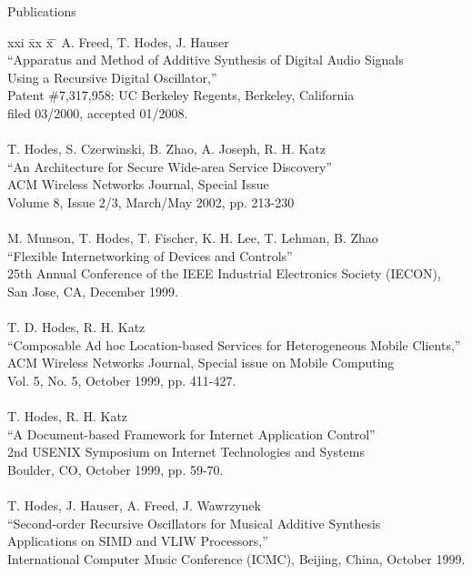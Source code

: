 \begin{bf} \large
Publications
\end{bf}
\begin{tabbing}
xxi \= xx \= x \= \kill
\>  A. Freed, T. Hodes, J. Hauser \\
\>\>	``Apparatus and Method of Additive Synthesis of Digital Audio Signals \\
\>\>\>  Using a Recursive Digital Oscillator,''  \\
\>\>	Patent \#7,317,958: UC Berkeley Regents, Berkeley, California \\
\>\> filed 03/2000, accepted 01/2008.  \\
\smallskip \\
\>    T. Hodes, S. Czerwinski, B. Zhao, A. Joseph, R. H. Katz \\
\>\>      ``An Architecture for Secure Wide-area Service Discovery'' \\
\>\>       ACM Wireless Networks Journal, Special Issue \\
\>\>       Volume 8, Issue 2/3, March/May 2002, pp. 213-230 \\

\smallskip \\[-3pt]
\>   M. Munson, T. Hodes, T. Fischer, K. H. Lee, T. Lehman, B. Zhao \\
\>\>      ``Flexible Internetworking of Devices and Controls'' \\
\>\>        25th Annual Conference of the IEEE Industrial Electronics Society (IECON),  \\
\>\>	    San Jose, CA, December 1999. \\
\smallskip \\[-3pt]
\>    T. D. Hodes, R. H. Katz \\
\>\>      ``Composable Ad hoc Location-based Services for Heterogeneous
             Mobile Clients,'' \\
\>\>       ACM Wireless Networks Journal, Special issue on Mobile Computing \\
\>\>       Vol. 5, No. 5, October 1999, pp. 411-427. \\
\smallskip \\[-3pt]
\>    T. Hodes, R. H. Katz \\
\>\>      ``A Document-based Framework for Internet Application Control'' \\
\>\>       2nd USENIX Symposium on Internet Technologies and Systems \\
\>\>       Boulder, CO, October 1999, pp. 59-70. \\
\smallskip \\[-3pt]
\>    T. Hodes, J. Hauser, A. Freed, J. Wawrzynek\\
\>\>      ``Second-order Recursive Oscillators for Musical Additive Synthesis \\
\>\>\>        Applications on SIMD and VLIW Processors,'' \\
\>\>       International Computer Music Conference (ICMC), Beijing, China, October 1999. \\
\end{tabbing}
